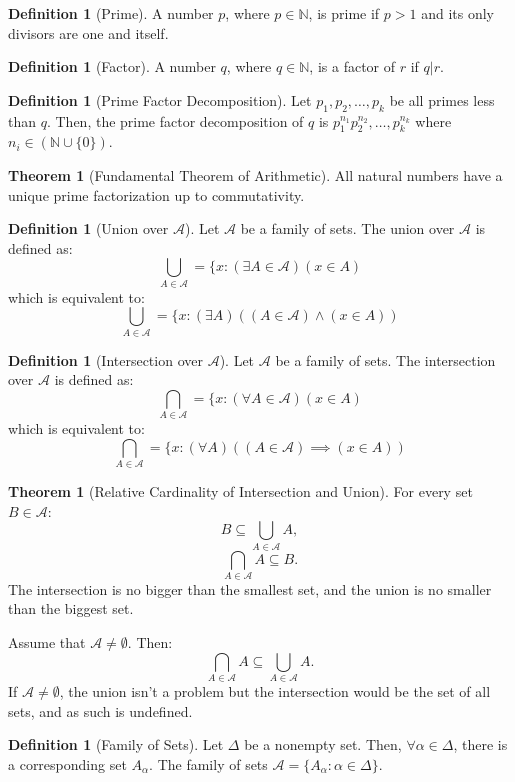 \documentclass[10pt]{article}
\theoremstyle{definition}
\newtheorem{definition}[equation]{Definition}
\newtheorem{theorem}[equation]{Theorem}
\newcommand{\N}{\mathbb{N}}
\begin{document}
\begin{definition}[Prime]
    A number $p$, where $p\in\N$, is prime if $p>1$ and its only divisors are one and itself.
\end{definition}

\begin{definition}[Factor]
  A number $q$, where $q\in\N$, is a factor of $r$ if $q|r$.
\end{definition}

\begin{definition}[Prime Factor Decomposition]
  Let $p_1,p_2,\dots,p_k$ be all primes less than $q$. Then, the prime factor decomposition of $q$ is $p_1^{n_1} p_2^{n_2},\dots, p_k^{n_k}$ where $n_i\in(\N\cup \{0\})$.
\end{definition}

\begin{theorem}[Fundamental Theorem of Arithmetic]
  All natural numbers have a unique prime factorization up to commutativity.
\end{theorem}

\begin{definition}[Union over $\mathcal{A}$]
  Let $\mathcal{A}$ be a family of sets. The union over $\mathcal{A}$ is defined as:
  $$\bigcup_{A\in\mathcal{A}} = \{x: (\exists A\in\mathcal{A})(x\in A)$$
  which is equivalent to:
  $$\bigcup_{A\in\mathcal{A}} = \{x: (\exists A)((A\in\mathcal{A})\land(x\in A))$$
\end{definition}

\begin{definition}[Intersection over $\mathcal{A}$]
  Let $\mathcal{A}$ be a family of sets. The intersection over $\mathcal{A}$ is defined as:
  $$\bigcap_{A\in\mathcal{A}} = \{x: (\forall A\in\mathcal{A})(x\in A)$$
  which is equivalent to:
  $$\bigcap_{A\in\mathcal{A}} = \{x: (\forall A)((A\in\mathcal{A})\implies(x\in A))$$
\end{definition}

\begin{theorem}[Relative Cardinality of Intersection and Union]
  For every set $B\in\mathcal{A}$:
    $$B\subseteq \bigcup_{A\in\mathcal{A}} A,$$
    $$\bigcap_{A\in\mathcal{A}} A\subseteq B.$$
  The intersection is no bigger than the smallest set, and the union is no smaller than the biggest set.

  Assume that $\mathcal{A} \neq \emptyset$. Then:
    $$\bigcap_{A\in\mathcal{A}} A\subseteq \bigcup_{A\in\mathcal{A}} A.$$
  If $\mathcal{A} \neq \emptyset$, the union isn't a problem but the intersection would be the set of all sets, and as such is undefined.
\end{theorem}

\begin{definition}[Family of Sets]
  Let $\Delta$ be a nonempty set. Then, $\forall\alpha\in\Delta$, there is a corresponding set $A_\alpha$. The family of sets $\mathcal{A} = \{A_\alpha: \alpha\in\Delta\}$.
\end{definition}
\end{document}
